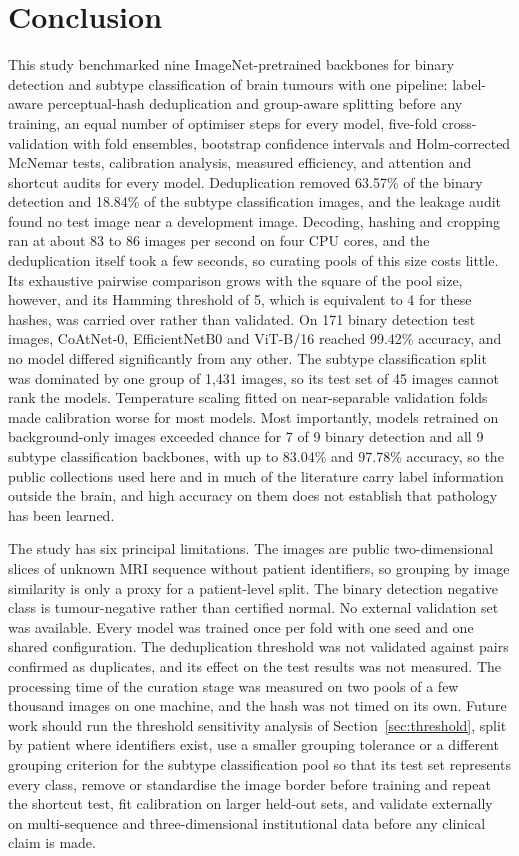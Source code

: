 \documentclass[a4paper,fleqn]{cas-sc}
\begin{document}
\section{Conclusion}
\label{sec:conclusion}

This study benchmarked nine ImageNet-pretrained backbones for binary detection and subtype classification of brain tumours with one pipeline: label-aware perceptual-hash deduplication and group-aware splitting before any training, an equal number of optimiser steps for every model, five-fold cross-validation with fold ensembles, bootstrap confidence intervals and Holm-corrected McNemar tests, calibration analysis, measured efficiency, and attention and shortcut audits for every model. Deduplication removed 63.57\% of the binary detection and 18.84\% of the subtype classification images, and the leakage audit found no test image near a development image. Decoding, hashing and cropping ran at about 83 to 86 images per second on four CPU cores, and the deduplication itself took a few seconds, so curating pools of this size costs little. Its exhaustive pairwise comparison grows with the square of the pool size, however, and its Hamming threshold of 5, which is equivalent to 4 for these hashes, was carried over rather than validated. On 171 binary detection test images, CoAtNet-0, EfficientNetB0 and ViT-B/16 reached 99.42\% accuracy, and no model differed significantly from any other. The subtype classification split was dominated by one group of 1,431 images, so its test set of 45 images cannot rank the models. Temperature scaling fitted on near-separable validation folds made calibration worse for most models. Most importantly, models retrained on background-only images exceeded chance for 7 of 9 binary detection and all 9 subtype classification backbones, with up to 83.04\% and 97.78\% accuracy, so the public collections used here and in much of the literature carry label information outside the brain, and high accuracy on them does not establish that pathology has been learned.

The study has six principal limitations. The images are public two-dimensional slices of unknown MRI sequence without patient identifiers, so grouping by image similarity is only a proxy for a patient-level split. The binary detection negative class is tumour-negative rather than certified normal. No external validation set was available. Every model was trained once per fold with one seed and one shared configuration. The deduplication threshold was not validated against pairs confirmed as duplicates, and its effect on the test results was not measured. The processing time of the curation stage was measured on two pools of a few thousand images on one machine, and the hash was not timed on its own. Future work should run the threshold sensitivity analysis of Section~\ref{sec:threshold}, split by patient where identifiers exist, use a smaller grouping tolerance or a different grouping criterion for the subtype classification pool so that its test set represents every class, remove or standardise the image border before training and repeat the shortcut test, fit calibration on larger held-out sets, and validate externally on multi-sequence and three-dimensional institutional data before any clinical claim is made.
\end{document}

